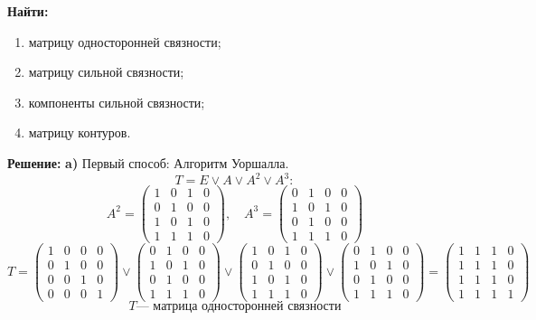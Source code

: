 \documentclass[14pt]{extarticle}
\begin{document}
\textbf{Найти:} 
\begin{enumerate}
    \item матрицу односторонней связности;
    \item матрицу сильной связности;
    \item компоненты сильной связности;
    \item матрицу контуров.
\end{enumerate}

\textbf{Решение:} 
\textbf{a)} Первый способ: Алгоритм Уоршалла.
\[
T = E \lor A \lor A^2 \lor A^3:
\]
\[
A^2 = \begin{pmatrix}
1 & 0 & 1 & 0 \\
0 & 1 & 0 & 0 \\
1 & 0 & 1 & 0 \\
1 & 1 & 1 & 0
\end{pmatrix}, \quad
A^3 = \begin{pmatrix}
0 & 1 & 0 & 0 \\
1 & 0 & 1 & 0 \\
0 & 1 & 0 & 0 \\
1 & 1 & 1 & 0
\end{pmatrix}
\]
\[
T = \begin{pmatrix}
1 & 0 & 0 & 0 \\
0 & 1 & 0 & 0 \\
0 & 0 & 1 & 0 \\
0 & 0 & 0 & 1
\end{pmatrix}
\lor
\begin{pmatrix}
0 & 1 & 0 & 0 \\
1 & 0 & 1 & 0 \\
0 & 1 & 0 & 0 \\
1 & 1 & 1 & 0
\end{pmatrix}
\lor
\begin{pmatrix}
1 & 0 & 1 & 0 \\
0 & 1 & 0 & 0 \\
1 & 0 & 1 & 0 \\
1 & 1 & 1 & 0
\end{pmatrix}
\lor
\begin{pmatrix}
0 & 1 & 0 & 0 \\
1 & 0 & 1 & 0 \\
0 & 1 & 0 & 0 \\
1 & 1 & 1 & 0
\end{pmatrix}
=
\begin{pmatrix}
1 & 1 & 1 & 0 \\
1 & 1 & 1 & 0 \\
1 & 1 & 1 & 0 \\
1 & 1 & 1 & 1
\end{pmatrix}
\]
\[
T \text{--- матрица односторонней связности}
\]
\end{document}
